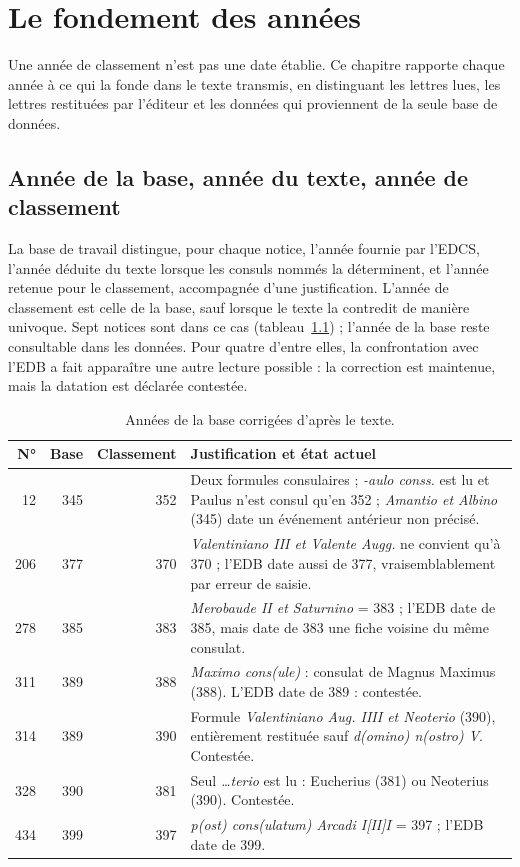 \chapter{Le fondement des années}\label{ch:fondement}

Une année de classement n’est pas une date établie. Ce chapitre rapporte chaque année à ce qui la fonde dans le texte transmis, en distinguant les lettres lues, les lettres restituées par l’éditeur et les données qui proviennent de la seule base de données.

\section{Année de la base, année du texte, année de classement}

La base de travail distingue, pour chaque notice, l’année fournie par l’EDCS, l’année déduite du texte lorsque les consuls nommés la déterminent, et l’année retenue pour le classement, accompagnée d’une justification. L’année de classement est celle de la base, sauf lorsque le texte la contredit de manière univoque. Sept notices sont dans ce cas (tableau~\ref{tab:correctionsbase}) ; l’année de la base reste consultable dans les données. Pour quatre d’entre elles, la confrontation avec l’EDB a fait apparaître une autre lecture possible : la correction est maintenue, mais la datation est déclarée contestée.

\begin{table}[tbp]\centering\small
\caption{Années de la base corrigées d’après le texte.}\label{tab:correctionsbase}
\begin{tabularx}{\linewidth}{@{}r r r X@{}}\toprule
N° & Base & Classement & Justification et état actuel\\\midrule
12 & 345 & 352 & Deux formules consulaires ; \emph{-aulo conss.} est lu et Paulus n’est consul qu’en 352 ; \emph{Amantio et Albino} (345) date un événement antérieur non précisé.\\
206 & 377 & 370 & \emph{Valentiniano III et Valente Augg.} ne convient qu’à 370 ; l’EDB date aussi de 377, vraisemblablement par erreur de saisie.\\
278 & 385 & 383 & \emph{Merobaude II et Saturnino} = 383 ; l’EDB date de 385, mais date de 383 une fiche voisine du même consulat.\\
311 & 389 & 388 & \emph{Maximo cons(ule)} : consulat de Magnus Maximus (388). L’EDB date de 389 : contestée.\\
314 & 389 & 390 & Formule \emph{Valentiniano Aug. IIII et Neoterio} (390), entièrement restituée sauf \emph{d(omino) n(ostro) V}. Contestée.\\
328 & 390 & 381 & Seul \emph{…terio} est lu : Eucherius (381) ou Neoterius (390). Contestée.\\
434 & 399 & 397 & \emph{p(ost) cons(ulatum) Arcadi I[II]I} = 397 ; l’EDB date de 399.\\\bottomrule
\end{tabularx}
\end{table}

